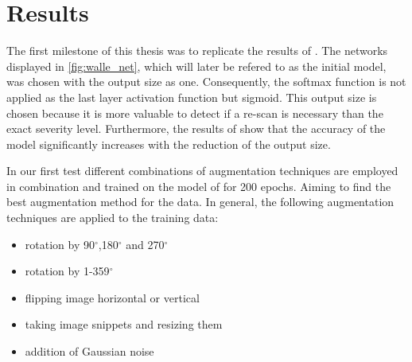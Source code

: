 \documentclass[
a4paper, 
12pt,
grayscalebody, %
abstract=on,
twoside, BCOR10mm, 12pt, DIV13,headinclude, footexclude, final, abstracton, openright
]{ibireprt}
\numberwithin{equation}{chapter}
\numberwithin{table}{chapter}
\numberwithin{figure}{chapter}
\numberwithin{algorithm}{chapter}
\numberwithin{example}{chapter}
\numberwithin{example}{chapter}
\begin{document}
\chapter{Results}


The first milestone of this thesis was to replicate the results of \cite{Walle2023}. The networks displayed in \ref{fig:walle_net}, which will later be refered to as the initial model, was chosen with the output size as one. Consequently, the softmax function is not applied as the last layer activation function but sigmoid. This output size is chosen because it is more valuable to detect if a re-scan is necessary than the exact severity level. Furthermore, the results of \cite{Walle2023} show that the accuracy of the model significantly increases with the reduction of the output size.

In our first test different combinations of augmentation techniques are employed in combination and trained on the model of \cite{Walle2023} for 200 epochs. Aiming to find the best augmentation method for the data. In general, the following augmentation techniques are applied to the training data: 


\begin{itemize}
	\item rotation by 90$^{\circ}$,180$^{\circ}$ and 270$^{\circ}$
	\item rotation by 1-359$^{\circ}$
	\item flipping image horizontal or vertical 
	\item taking image snippets and resizing them 
	\item addition of Gaussian noise 
\end{itemize}
\end{document}
